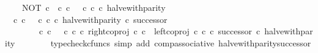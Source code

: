 \begin{isabellebody}
\ \ \ \ NOT\ {\isasymcirc}\isactrlsub c\ {\isacharparenleft}{\kern0pt}{\isasymf}\ {\isasymcirc}\isactrlsub c\ {\isasymbeta}\isactrlbsub {\isasymnat}\isactrlsub c\isactrlesub {\isacharparenright}{\kern0pt}\ {\isasymamalg}\ {\isacharparenleft}{\kern0pt}{\isasymt}\ {\isasymcirc}\isactrlsub c\ {\isasymbeta}\isactrlbsub {\isasymnat}\isactrlsub c\isactrlesub {\isacharparenright}{\kern0pt}\ {\isasymcirc}\isactrlsub c\ halve{\isacharunderscore}{\kern0pt}with{\isacharunderscore}{\kern0pt}parity{\isachardoublequoteclose}\isanewline
\ \ \isamarkupfalse%
\ {\isacharminus}{\kern0pt}\isanewline
\ \ \ \ \isamarkupfalse%
\ {\isachardoublequoteopen}{\isacharparenleft}{\kern0pt}{\isacharparenleft}{\kern0pt}{\isasymf}\ {\isasymcirc}\isactrlsub c\ {\isasymbeta}\isactrlbsub {\isasymnat}\isactrlsub c\isactrlesub {\isacharparenright}{\kern0pt}\ {\isasymamalg}\ {\isacharparenleft}{\kern0pt}{\isasymt}\ {\isasymcirc}\isactrlsub c\ {\isasymbeta}\isactrlbsub {\isasymnat}\isactrlsub c\isactrlesub {\isacharparenright}{\kern0pt}\ {\isasymcirc}\isactrlsub c\ halve{\isacharunderscore}{\kern0pt}with{\isacharunderscore}{\kern0pt}parity{\isacharparenright}{\kern0pt}\ {\isasymcirc}\isactrlsub c\ successor\isanewline
\ \ \ \ \ \ {\isacharequal}{\kern0pt}\ {\isacharparenleft}{\kern0pt}{\isasymf}\ {\isasymcirc}\isactrlsub c\ {\isasymbeta}\isactrlbsub {\isasymnat}\isactrlsub c\isactrlesub {\isacharparenright}{\kern0pt}\ {\isasymamalg}\ {\isacharparenleft}{\kern0pt}{\isasymt}\ {\isasymcirc}\isactrlsub c\ {\isasymbeta}\isactrlbsub {\isasymnat}\isactrlsub c\isactrlesub {\isacharparenright}{\kern0pt}\ {\isasymcirc}\isactrlsub c\ {\isacharparenleft}{\kern0pt}right{\isacharunderscore}{\kern0pt}coproj\ {\isasymnat}\isactrlsub c\ {\isasymnat}\isactrlsub c\ {\isasymamalg}\ {\isacharparenleft}{\kern0pt}left{\isacharunderscore}{\kern0pt}coproj\ {\isasymnat}\isactrlsub c\ {\isasymnat}\isactrlsub c\ {\isasymcirc}\isactrlsub c\ successor{\isacharparenright}{\kern0pt}{\isacharparenright}{\kern0pt}\ {\isasymcirc}\isactrlsub c\ halve{\isacharunderscore}{\kern0pt}with{\isacharunderscore}{\kern0pt}parity{\isachardoublequoteclose}\isanewline
\ \ \ \ \ \ \isamarkupfalse%
\ {\isacharparenleft}{\kern0pt}typecheck{\isacharunderscore}{\kern0pt}cfuncs{\isacharcomma}{\kern0pt}\ simp\ add{\isacharcolon}{\kern0pt}\ comp{\isacharunderscore}{\kern0pt}associative{}\ halve{\isacharunderscore}{\kern0pt}with{\isacharunderscore}{\kern0pt}parity{\isacharunderscore}{\kern0pt}successor{\isacharparenright}{\kern0pt}\isanewline
\ \ \ \ \isamarkupfalse%
\ \isamarkupfalse%

\end{isabellebody}
